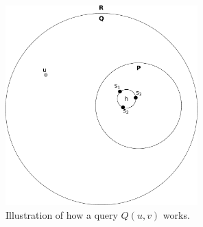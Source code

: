 \begin{figure}[h!]
  \centering
  \includegraphics[width=0.66\textwidth]{figs/vd1.pdf}
  \caption{Illustration of how a query $Q(u,v)$ works.}
    \label{vd1}
\end{figure}

